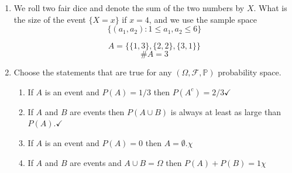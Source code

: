 \documentclass[10pt]{article}
\begin{document}
\begin{enumerate}
\newpage
  \item We roll two fair dice and denote the sum of the two numbers by
    $X$. What is the size of the event $\{X = x\}$ if $x=4$, and we
    use the sample space 
    \[ \{(a_1, a_2): 1 \leq a_1, a_2 \leq 6\} \]

    \[ A = \{ \{ 1,3 \}, \{2,2\}, \{3,1\} \} \]
      \[ \#A = 3 \]

\newpage
  \item Choose the statements that are true for any 
    $(\Omega, \mathcal{F}, \mathbb{P})$ probability space.

    \begin{enumerate}
      \item If $A$ is an event and $P(A)=1 / 3$ then $P\left(A^c\right)=2 / 3$$\checkmark$
      \item If $A$ and $B$ are events then $P(A \cup B)$ is always at least as large than $P(A)$.$\checkmark$
      \item If $A$ is an event and $P(A)=0$ then $A=\emptyset.\chi$
      \item If $A$ and $B$ are events and $A \cup B=\Omega$ then $P(A)+P(B)=1\chi$
    \end{enumerate}
\end{enumerate}
\end{document}
